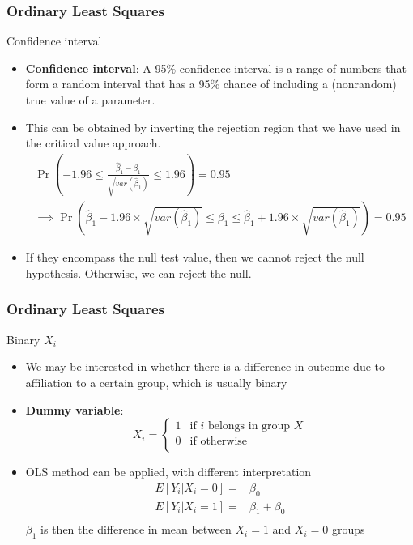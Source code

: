 \documentclass[compress]{beamer}
\begin{document}
\begin{frame}
\frametitle{Ordinary Least Squares}
Confidence interval
\begin{itemize}
\item  \textbf{Confidence interval}: A 95\% confidence interval is a range of numbers that form a random interval that has a 95\% chance of including a (nonrandom) true value of a parameter. 
\item This can be obtained by inverting the rejection region that we have used in the critical value approach.
\footnotesize{\begin{gather*}
\Pr\left(-1.96\leq \frac{\hat{\beta}_1-\beta_1}{\sqrt{var(\hat{\beta}_1)}} \leq1.96\right)=0.95\\
\implies \Pr\left(\hat{\beta}_1-1.96\times\sqrt{var(\hat{\beta}_1)} \leq \beta_1 \leq\hat{\beta}_1+1.96\times\sqrt{var(\hat{\beta}_1)}\right)=0.95
\end{gather*}}\normalsize
\item  If they encompass the null test value, then we cannot reject the null hypothesis. Otherwise, we can reject the null. 
\end{itemize}
\end{frame}

\begin{frame}
\frametitle{Ordinary Least Squares}
Binary $X_i$
\begin{itemize}
\item We may be interested in whether there is a difference in outcome due to affiliation to a certain group, which is usually binary
\item \textbf{Dummy variable}: 
\[
X_i = \begin{cases} 1 & \text{if $i$ belongs in group $X$} \\  0 & \text{if otherwise} \\ \end{cases}
\]
\item OLS method can be applied, with different interpretation
\[
\begin{aligned}
E[Y_i |X_i=0]=& \beta_0\\
E[Y_i |X_i=1]=& \beta_1+\beta_0\\
\end{aligned}
\]
$\beta_1$ is then the difference in mean between $X_i=1$ and $X_i=0$ groups
\end{itemize}
\end{frame}
\end{document}
